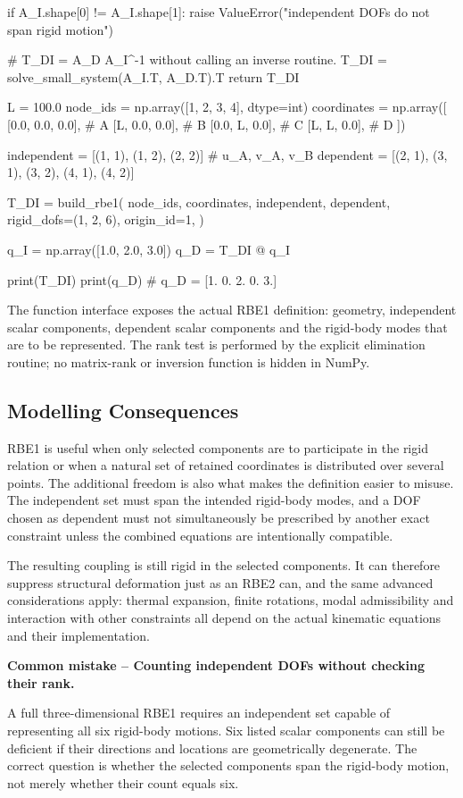 \begin{python}
    if A_I.shape[0] != A_I.shape[1]:
        raise ValueError("independent DOFs do not span rigid motion")

    # T_DI = A_D A_I^-1 without calling an inverse routine.
    T_DI = solve_small_system(A_I.T, A_D.T).T
    return T_DI


L = 100.0
node_ids = np.array([1, 2, 3, 4], dtype=int)
coordinates = np.array([
    [0.0, 0.0, 0.0],  # A
    [L,   0.0, 0.0],  # B
    [0.0, L,   0.0],  # C
    [L,   L,   0.0],  # D
])

independent = [(1, 1), (1, 2), (2, 2)]  # u_A, v_A, v_B
dependent = [(2, 1), (3, 1), (3, 2), (4, 1), (4, 2)]

T_DI = build_rbe1(
    node_ids, coordinates,
    independent, dependent,
    rigid_dofs=(1, 2, 6),
    origin_id=1,
)

q_I = np.array([1.0, 2.0, 3.0])
q_D = T_DI @ q_I

print(T_DI)
print(q_D)
# q_D = [1. 0. 2. 0. 3.]
\end{python}

The function interface exposes the actual RBE1 definition: geometry,
independent scalar components, dependent scalar components and the rigid-body
modes that are to be represented. The rank test is performed by the explicit
elimination routine; no matrix-rank or inversion function is hidden in NumPy.

\subsection{Modelling Consequences}

RBE1 is useful when only selected components are to participate in the rigid
relation or when a natural set of retained coordinates is distributed over
several points. The additional freedom is also what makes the definition easier
to misuse. The independent set must span the intended rigid-body modes, and a
DOF chosen as dependent must not simultaneously be prescribed by another exact
constraint unless the combined equations are intentionally compatible.

The resulting coupling is still rigid in the selected components. It can
therefore suppress structural deformation just as an RBE2 can, and the same
advanced considerations apply: thermal expansion, finite rotations, modal
admissibility and interaction with other constraints all depend on the actual
kinematic equations and their implementation.

\begin{bbox}
\textbf{Common mistake -- Counting independent DOFs without checking their rank.}

A full three-dimensional RBE1 requires an independent set capable of representing
all six rigid-body motions. Six listed scalar components can still be deficient
if their directions and locations are geometrically degenerate. The correct
question is whether the selected components span the rigid-body motion, not merely
whether their count equals six.
\end{bbox}

